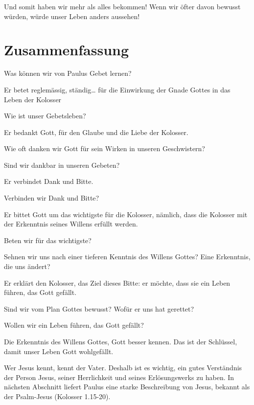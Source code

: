 \documentclass[
  12pt,
]{krantz}
\makeatletter
\newenvironment{kframe}{%
\medskip{}
\setlength{\fboxsep}{.8em}
 \def\at@end@of@kframe{}%
 \ifinner\ifhmode%
  \def\at@end@of@kframe{\end{minipage}}%
  \begin{minipage}{\columnwidth}%
 \fi\fi%
 \def\FrameCommand##1{\hskip\@totalleftmargin \hskip-\fboxsep
 \colorbox{shadecolor}{##1}\hskip-\fboxsep
     \hskip-\linewidth \hskip-\@totalleftmargin \hskip\columnwidth}%
 \MakeFramed {\advance\hsize-\width
   \@totalleftmargin\z@ \linewidth\hsize
   \@setminipage}}%
 {\par\unskip\endMakeFramed%
 \at@end@of@kframe}
\newenvironment{rmdblock}[1]
  {
  \begin{itemize}
  \renewcommand{\labelitemi}{
    \raisebox{-.7\height}[0pt][0pt]{
      {\setkeys{Gin}{width=3em,keepaspectratio}\texttt{[image: img/\#1]}}
    }
  }
  \setlength{\fboxsep}{1em}
  \begin{kframe}
  \item
  }
  {
  \end{kframe}
  \end{itemize}
  }
\newenvironment{rmdquestion}
  {\begin{rmdblock}{question}}
  {\end{rmdblock}}
\makeatother
\begin{document}
Und somit haben wir mehr als alles bekommen! Wenn wir öfter davon bewusst würden, würde unser Leben anders aussehen!

\hypertarget{zusammenfassung}{%
\section{Zusammenfassung}\label{zusammenfassung}}

Was können wir von Paulus Gebet lernen?

Er betet reglemässig, ständig\ldots{} für die Einwirkung der Gnade Gottes in das Leben der Kolosser

\begin{rmdquestion}
Wie ist unser Gebetsleben?
\end{rmdquestion}

Er bedankt Gott, für den Glaube und die Liebe der Kolosser.

\begin{rmdquestion}
Wie oft danken wir Gott für sein Wirken in unseren Geschwistern?

Sind wir dankbar in unseren Gebeten?
\end{rmdquestion}

Er verbindet Dank und Bitte.

\begin{rmdquestion}
Verbinden wir Dank und Bitte?
\end{rmdquestion}

Er bittet Gott um das wichtigste für die Kolosser, nämlich, dass die Kolosser mit der Erkenntnis seines Willens erfüllt werden.

\begin{rmdquestion}
Beten wir für das wichtigste?

Sehnen wir uns nach einer tieferen Kenntnis des Willens Gottes? Eine
Erkenntnis, die uns ändert?
\end{rmdquestion}

Er erklärt den Kolosser, das Ziel dieses Bitte: er möchte, dass sie ein Leben führen, das Gott gefällt.

\begin{rmdquestion}
Sind wir vom Plan Gottes bewusst? Wofür er uns hat gerettet?

Wollen wir ein Leben führen, das Gott gefällt?
\end{rmdquestion}

Die Erkenntnis des Willens Gottes, Gott besser kennen. Das ist der Schlüssel, damit unser Leben Gott wohlgefällt.

Wer Jesus kennt, kennt der Vater. Deshalb ist es wichtig, ein gutes Verständnis der Person Jesus, seiner Herrlichkeit und seines Erlösungswerks zu haben. In nächsten Abschnitt liefert Paulus eine starke Beschreibung von Jesus, bekannt als der Psalm-Jesus (Kolosser 1.15-20).

  

\printindex
\end{document}

